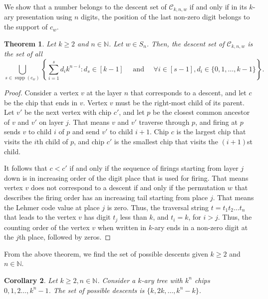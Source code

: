 \documentclass[final]{dmtcs-episciences}
\newtheorem{theorem}{Theorem}[section]
\newtheorem{corollary}[theorem]{Corollary} %
\theoremstyle{definition}
\theoremstyle{remark}
\DeclareMathOperator{\supp}{supp}
\begin{document}
We show that a number belongs to the descent set of $\mathcal{C}_{k, n, w}$ if and only if in its $k$-ary presentation using $n$ digits, the position of the last non-zero digit belongs to the support of $c_w$.

\begin{theorem}\label{thm:DescentSets}
        Let $k \geq 2$ and $n \in \mathbb{N}$. Let $w \in S_n$. Then, the descent set of $\mathcal{C}_{k, n, w}$ is the set of all
    \begin{equation}\label{eq:DescentSet}
    \bigcup_{s \in \supp(c_w)}\left\{ \sum_{i=1}^{s}d_ik^{n-i}: d_s \in [k-1] \quad \mbox{ and } \quad \forall i \in [s-1], d_i \in \{0, 1, \dots, k-1\}\right\}.
            \end{equation}
\end{theorem}

\begin{proof}
    Consider a vertex $v$ at the layer $n$ that corresponds to a descent, and let $c$ be the chip that ends in $v$. Vertex $v$ must be the right-most child of its parent. Let $v'$ be the next vertex with chip $c'$, and let $p$ be the closest common ancestor of $v$ and $v'$ on layer $j$. That means $v$ and $v'$ traverse through $p$, and firing at $p$ sends $v$ to child $i$ of $p$ and send $v'$ to child $i+1$. Chip $c$ is the largest chip that visits the $i$th child of $p$, and chip $c'$ is the smallest chip that visits the $(i+1)$st child.

    It follows that $c < c'$ if and only if the sequence of firings starting from layer $j$ down is in increasing order of the digit place that is used for firing. That means vertex $v$ does not correspond to a descent if and only if the permutation $w$ that describes the firing order has an increasing tail starting from place $j$. That means the Lehmer code value at place $j$ is zero. Thus, the traversal string $t = t_1t_2\dots t_n$ that leads to the vertex $v$ has digit $t_j$ less than $k$, and $t_i = k$, for $i>j$. Thus, the counting order of the vertex $v$ when written in $k$-ary ends in a non-zero digit at the $j$th place, followed by zeros.
\end{proof}

From the above theorem, we find the set of possible descents given $k \geq 2$ and $n \in \mathbb{N}$.
\begin{corollary}
    Let $k \geq 2, n \in \mathbb{N}$. Consider a $k$-ary tree with $k^n$ chips $0,1,2 \dots, k^n-1$. The set of possible descents is $\{k, 2k, \dots, k^n-k\}$. 
\end{corollary}
\end{document}
